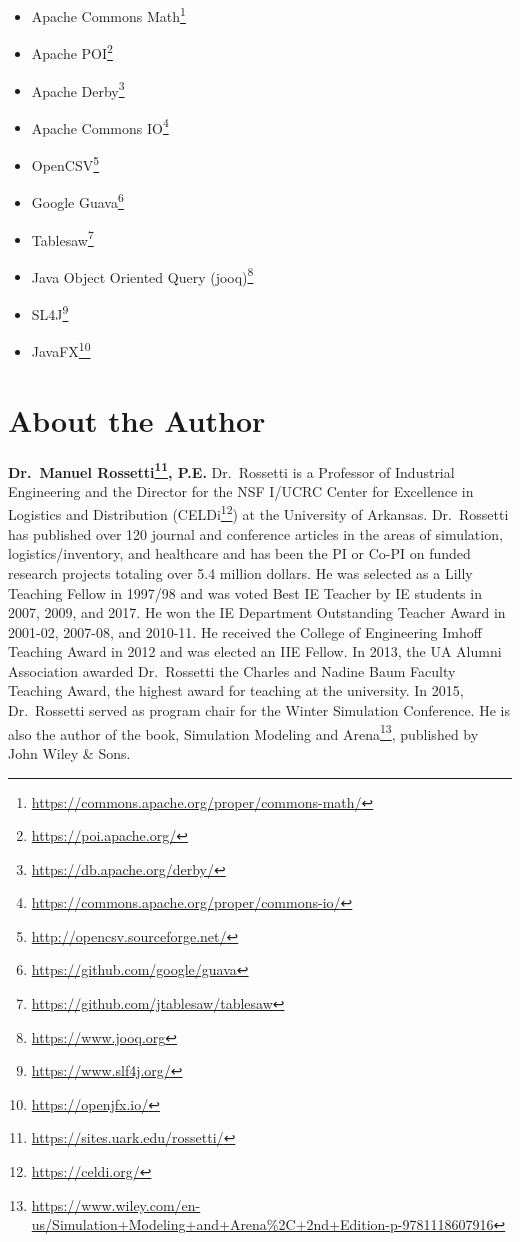 \documentclass[
]{book}
\providecommand{\tightlist}{%
  \setlength{\itemsep}{0pt}\setlength{\parskip}{0pt}}
\renewcommand{\href}[2]{#2\footnote{\url{#1}}}
\theoremstyle{definition}
\theoremstyle{definition}
\theoremstyle{definition}
\theoremstyle{definition}
\theoremstyle{remark}
\begin{document}
\begin{itemize}
\tightlist
\item
  \href{https://commons.apache.org/proper/commons-math/}{Apache Commons Math}
\item
  \href{https://poi.apache.org/}{Apache POI}
\item
  \href{https://db.apache.org/derby/}{Apache Derby}
\item
  \href{https://commons.apache.org/proper/commons-io/}{Apache Commons IO}
\item
  \href{http://opencsv.sourceforge.net/}{OpenCSV}
\item
  \href{https://github.com/google/guava}{Google Guava}
\item
  \href{https://github.com/jtablesaw/tablesaw}{Tablesaw}
\item
  \href{https://www.jooq.org}{Java Object Oriented Query (jooq)}
\item
  \href{https://www.slf4j.org/}{SL4J}
\item
  \href{https://openjfx.io/}{JavaFX}
\end{itemize}

\hypertarget{about-the-author}{%
\chapter*{About the Author}\label{about-the-author}}


\textbf{Dr.~\href{https://sites.uark.edu/rossetti/}{Manuel Rossetti}, P.E.} Dr.~Rossetti is a Professor of Industrial Engineering and the Director for the NSF I/UCRC Center for Excellence in Logistics and Distribution (\href{https://celdi.org/}{CELDi}) at the University of Arkansas. Dr.~Rossetti has published over 120 journal and conference articles in the areas of simulation, logistics/inventory, and healthcare and has been the PI or Co-PI on funded research projects totaling over 5.4 million dollars. He was selected as a Lilly Teaching Fellow in 1997/98 and was voted Best IE Teacher by IE students in 2007, 2009, and 2017. He won the IE Department Outstanding Teacher Award in 2001-02, 2007-08, and 2010-11. He received the College of Engineering Imhoff Teaching Award in 2012 and was elected an IIE Fellow. In 2013, the UA Alumni Association awarded Dr.~Rossetti the Charles and Nadine Baum Faculty Teaching Award, the highest award for teaching at the university. In 2015, Dr.~Rossetti served as program chair for the Winter Simulation Conference. He is also the author of the book, \href{https://www.wiley.com/en-us/Simulation+Modeling+and+Arena\%2C+2nd+Edition-p-9781118607916}{Simulation Modeling and Arena}, published by John Wiley \& Sons.
\end{document}
